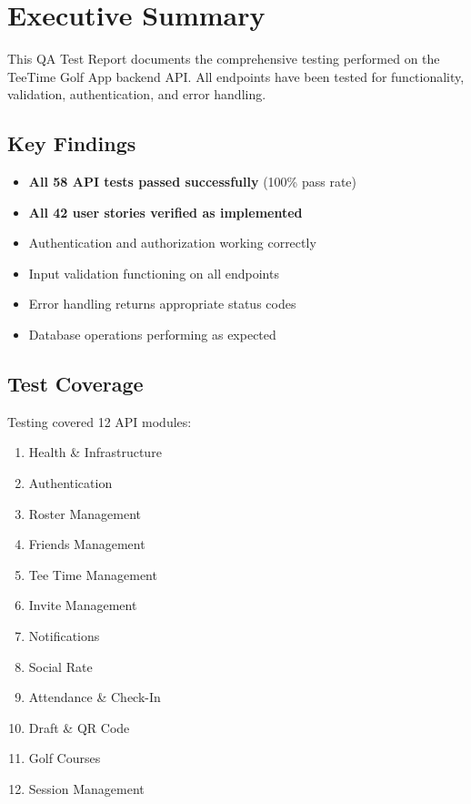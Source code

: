 \documentclass[11pt,a4paper]{article}
\begin{document}
\section{Executive Summary}

This QA Test Report documents the comprehensive testing performed on the TeeTime Golf App backend API. All endpoints have been tested for functionality, validation, authentication, and error handling.

\subsection{Key Findings}
\begin{itemize}
  \item \textbf{All 58 API tests passed successfully} (100\% pass rate)
  \item \textbf{All 42 user stories verified as implemented}
  \item Authentication and authorization working correctly
  \item Input validation functioning on all endpoints
  \item Error handling returns appropriate status codes
  \item Database operations performing as expected
\end{itemize}

\subsection{Test Coverage}
Testing covered 12 API modules:
\begin{enumerate}
  \item Health \& Infrastructure
  \item Authentication
  \item Roster Management
  \item Friends Management
  \item Tee Time Management
  \item Invite Management
  \item Notifications
  \item Social Rate
  \item Attendance \& Check-In
  \item Draft \& QR Code
  \item Golf Courses
  \item Session Management
\end{enumerate}
\end{document}
